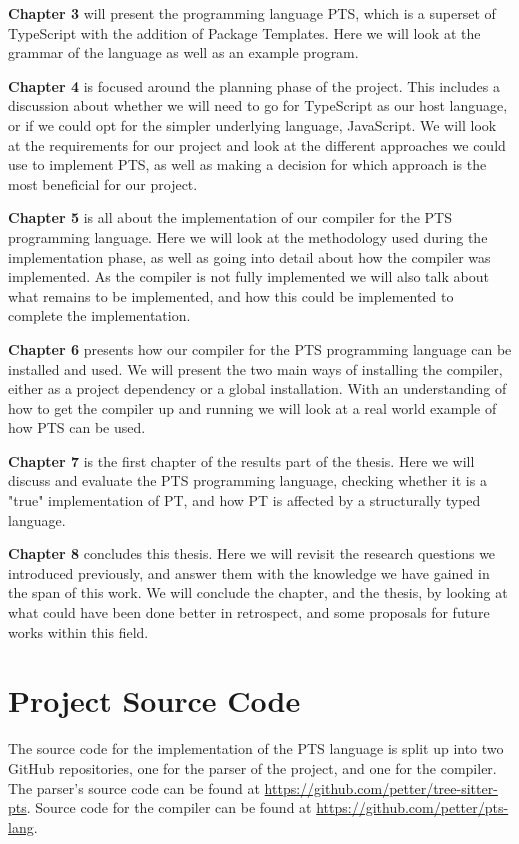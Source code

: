 \textbf{Chapter 3} will present the programming language PTS, which is a superset of TypeScript with the addition of Package Templates.
Here we will look at the grammar of the language as well as an example program.

\textbf{Chapter 4} is focused around the planning phase of the project.
This includes a discussion about whether we will need to go for TypeScript as our host language, or if we could opt for the simpler underlying language, JavaScript.
We will look at the requirements for our project and look at the different approaches we could use to implement PTS, as well as making a decision for which approach is the most beneficial for our project.

\textbf{Chapter 5} is all about the implementation of our compiler for the PTS programming language.
Here we will look at the methodology used during the implementation phase, as well as going into detail about how the compiler was implemented.
As the compiler is not fully implemented we will also talk about what remains to be implemented, and how this could be implemented to complete the implementation.

\textbf{Chapter 6} presents how our compiler for the PTS programming language can be installed and used.
We will present the two main ways of installing the compiler, either as a project dependency or a global installation.
With an understanding of how to get the compiler up and running we will look at a real world example of how PTS can be used.

\textbf{Chapter 7} is the first chapter of the results part of the thesis.
Here we will discuss and evaluate the PTS programming language, checking whether it is a "true" implementation of PT, and how PT is affected by a structurally typed language.

\textbf{Chapter 8} concludes this thesis.
Here we will revisit the research questions we introduced previously, and answer them with the knowledge we have gained in the span of this work.
We will conclude the chapter, and the thesis, by looking at what could have been done better in retrospect, and some proposals for future works within this field.

\section{Project Source Code}\label{sec:project-source-code}

The source code for the implementation of the PTS language is split up into two GitHub repositories, one for the parser of the project, and one for the compiler.
The parser's source code can be found at \url{https://github.com/petter/tree-sitter-pts}.
Source code for the compiler can be found at \url{https://github.com/petter/pts-lang}.
